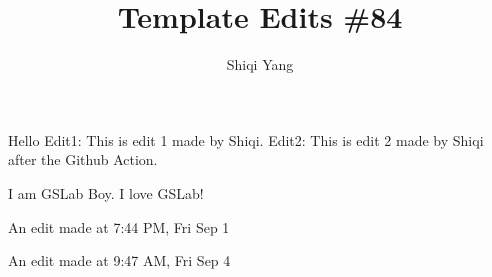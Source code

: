 \documentclass{report}
\title{\Huge{Template Edits \#84}\\}
\author{\huge{Shiqi Yang}}
\date{}
\begin{document}
\maketitle
Hello
Edit1: This is edit 1 made by Shiqi.
Edit2: This is edit 2 made by Shiqi after the Github Action.


I am GSLab Boy. I love GSLab!

An edit made at 7:44 PM, Fri Sep 1

An edit made at 9:47 AM, Fri Sep 4
\end{document}
